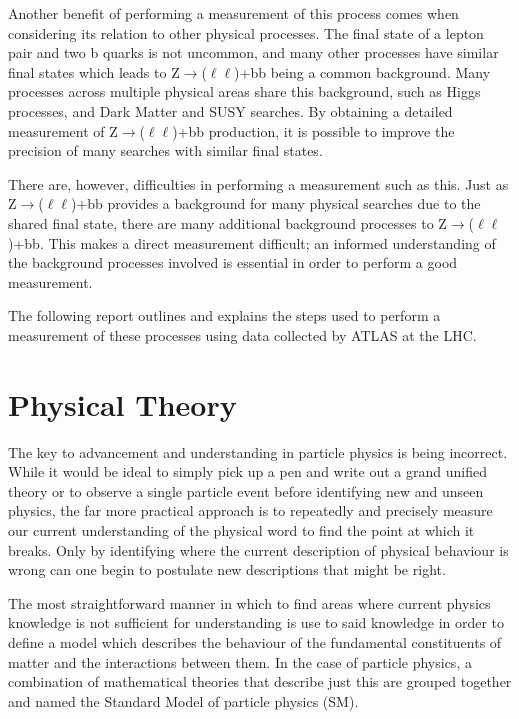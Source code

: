 \documentclass[12pt,a4paper,epsf,portrait,times,epsfig]{report}
\begin{document}
	Another benefit of performing a measurement of this process comes when considering its relation to other physical processes. The final state of a lepton pair and two b quarks is not	uncommon, and many other processes have similar final states which leads to Z$\rightarrow$($\ell\ell$)+bb being a common background. Many processes across multiple physical areas share this background, such as Higgs processes, and Dark Matter and SUSY searches. By obtaining a detailed measurement of Z$\rightarrow$($\ell\ell$)+bb production, it is possible to improve the precision
	of many searches with similar final states. \par

	There are, however, difficulties in performing a measurement such as this. Just as Z$\rightarrow$($\ell\ell$)+bb provides a background for many physical searches due to the shared final state, there are many additional background processes to Z$\rightarrow$($\ell\ell$)+bb. This makes a direct measurement difficult; an informed understanding of the background processes involved is essential in order to perform a good measurement. \par

	The following report outlines and explains the steps used to perform a measurement of these processes using data collected by ATLAS at the LHC.

	\newpage
	
	\chapter{Physical Theory}
	
	The key to advancement and understanding in particle physics is being incorrect. While it would be ideal to simply pick up a pen and write out a grand unified theory or to observe a single particle event before identifying new and unseen physics, the far more practical approach is to repeatedly and precisely measure our current understanding of the physical word to find the point at which it breaks. Only by identifying where the current description of physical behaviour is wrong can one begin to postulate new descriptions that might be right. \par

	The most straightforward manner in which to find areas where current physics knowledge is not sufficient for understanding is use to said knowledge in order to define a model which describes the behaviour of the fundamental constituents of matter and the interactions between them. In the case of particle physics, a combination of mathematical theories that describe just this are grouped together and named the Standard Model of particle physics (SM). 
\end{document}
